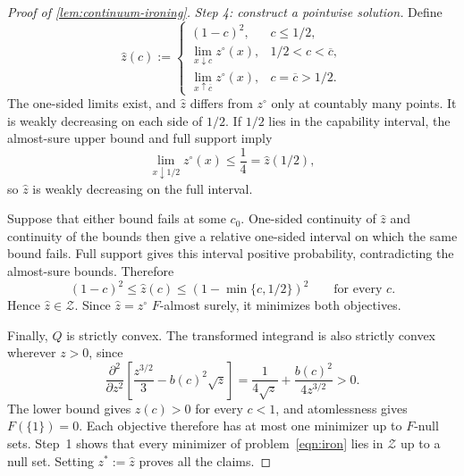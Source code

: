 \documentclass[12pt,reqno]{article}
\theoremstyle{definition} \newtheorem{example}{Example}
\theoremstyle{definition} \newtheorem{condition}{Condition}
\theoremstyle{definition} \newtheorem{corollary}{Corollary}
\theoremstyle{definition} \newtheorem{claim}{Claim}
\theoremstyle{definition} \newtheorem{definition}{Definition}
\theoremstyle{definition} \newtheorem{conjecture}{Conjecture}
\theoremstyle{definition} \newtheorem{Lemma}{Lemma}
\theoremstyle{definition} \newtheorem{lemma}{Lemma}
\theoremstyle{plain} \newtheorem{theorem}{Theorem}
\theoremstyle{definition} \newtheorem{assumption}{Assumption}
\theoremstyle{definition} \newtheorem*{assumptionnonumber}{Assumption}
\theoremstyle{definition} \newtheorem*{theoremNoNumber}{Proposition}
\theoremstyle{definition}\newtheorem{proposition}{Proposition}
\theoremstyle{definition} \newtheorem{observation}{Observation}
\theoremstyle{definition} \newtheorem*{definitionNoNumber}{Definition}
\theoremstyle{definition} \newtheorem{Definition}{Definition}
\theoremstyle{definition} \newtheorem*{DefinitionNoNumber}{Definition}
\theoremstyle{definition} \newtheorem*{fact}{Fact}
\theoremstyle{definition} \newtheorem*{property}{Property}
\theoremstyle{definition} \newtheorem{remark}{Remark}
\theoremstyle{definition}\newtheorem{romanexampleinner}{Example}
\begin{document}
\begin{proof}[Proof of \cref{lem:continuum-ironing}]
\emph{Step 4: construct a pointwise solution.}
Define
\[
\widehat z(c)
:=
\begin{cases}
(1-c)^2,&c\leq1/2,\\[4pt]
\displaystyle\lim_{x\downarrow c}z^\circ(x),
&1/2<c<\overline c,\\[7pt]
\displaystyle\lim_{x\uparrow\overline c}z^\circ(x),
&c=\overline c>1/2.
\end{cases}
\]
The one-sided limits exist, and \(\widehat z\) differs from \(z^\circ\) only at countably many points. It is weakly decreasing on each side of \(1/2\). If \(1/2\) lies in the capability interval, the almost-sure upper bound and full support imply
\[
\lim_{x\downarrow1/2}z^\circ(x)\leq\frac14=\widehat z(1/2),
\]
so \(\widehat z\) is weakly decreasing on the full interval.

Suppose that either bound fails at some \(c_0\). One-sided continuity of \(\widehat z\) and continuity of the bounds then give a relative one-sided interval on which the same bound fails. Full support gives this interval positive probability, contradicting the almost-sure bounds. Therefore
\[
(1-c)^2
\leq
\widehat z(c)
\leq
\left(1-\min\{c,1/2\}\right)^2
\qquad\text{for every }c.
\]
Hence \(\widehat z\in\mathcal Z\). Since \(\widehat z=z^\circ\) \(F\)-almost surely, it minimizes both objectives.

Finally, \(Q\) is strictly convex. The transformed integrand is also strictly convex wherever \(z>0\), since
\[
\frac{\partial^2}{\partial z^2}
\left[
\frac{z^{3/2}}3-b(c)^2\sqrt z
\right]
=
\frac{1}{4\sqrt z}
+\frac{b(c)^2}{4z^{3/2}}
>0.
\]
The lower bound gives \(z(c)>0\) for every \(c<1\), and atomlessness gives \(F(\{1\})=0\). Each objective therefore has at most one minimizer up to \(F\)-null sets. Step~1 shows that every minimizer of problem~\eqref{eqn:iron} lies in \(\mathcal Z\) up to a null set. Setting \(z^*:=\widehat z\) proves all the claims.
\end{proof}
\end{document}
